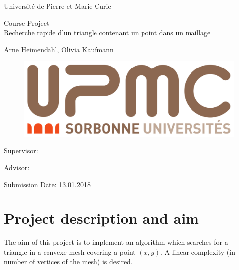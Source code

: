 \documentclass[10pt]{article}
\begin{document}
	
\begin{titlepage}
	\begin{center}
	
		{\Large
			Université de Pierre et Marie Curie 
		}
		\normalsize
		
		Course Project\\[15mm]
		
		{\Huge
			Recherche rapide d’un triangle contenant un point dans un maillage
		}
		\vspace{2cm}
		
		\normalsize
		
		Arne Heimendahl, Olivia Kaufmann
		
		\begin{figure}[t]
			\includegraphics[scale=0.1]{UPMC_Sorbonne_Universites.png}
		\end{figure}
		
	\end{center}
	\vspace*{75mm}
	
	Supervisor: 
	\medskip
	
	Advisor: 
	\medskip
	
	Submission Date: 13.01.2018 
	
\end{titlepage}

\newpage
\tableofcontents
\newpage

	

\section{Project description and aim}

The aim of this project is to implement an algorithm which searches for a triangle in a convexe mesh covering a point $(x,y)$. A linear complexity (in number of vertices of the mesh) is desired.
\end{document}
